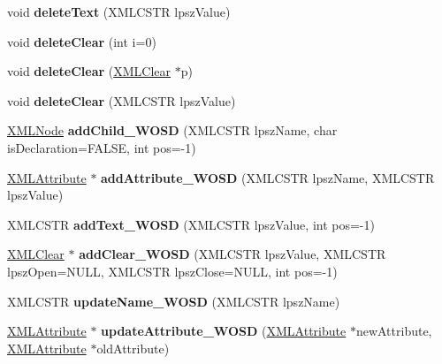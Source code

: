 \begin{DoxyCompactItemize}
void {\bfseries delete\+Text} (X\+M\+L\+C\+S\+TR lpsz\+Value)
\item 
\hypertarget{struct_x_m_l_node_a44b72c82310eb4319dba46eb9cc9f6e9}{}\label{struct_x_m_l_node_a44b72c82310eb4319dba46eb9cc9f6e9} 
void {\bfseries delete\+Clear} (int i=0)
\item 
\hypertarget{struct_x_m_l_node_ae92182823d3d5b40893103ad222ec4a8}{}\label{struct_x_m_l_node_ae92182823d3d5b40893103ad222ec4a8} 
void {\bfseries delete\+Clear} (\hyperlink{struct_x_m_l_clear}{X\+M\+L\+Clear} $\ast$p)
\item 
\hypertarget{struct_x_m_l_node_a8fff4baa9a8000f8662ee302438fff64}{}\label{struct_x_m_l_node_a8fff4baa9a8000f8662ee302438fff64} 
void {\bfseries delete\+Clear} (X\+M\+L\+C\+S\+TR lpsz\+Value)
\item 
\hypertarget{struct_x_m_l_node_acb8f9583792c008c80a6c788f3dedf39}{}\label{struct_x_m_l_node_acb8f9583792c008c80a6c788f3dedf39} 
\hyperlink{struct_x_m_l_node}{X\+M\+L\+Node} {\bfseries add\+Child\+\_\+\+W\+O\+SD} (X\+M\+L\+C\+S\+TR lpsz\+Name, char is\+Declaration=F\+A\+L\+SE, int pos=-\/1)
\item 
\hypertarget{struct_x_m_l_node_a776e46bdd596a7eff1d2dd4105c64034}{}\label{struct_x_m_l_node_a776e46bdd596a7eff1d2dd4105c64034} 
\hyperlink{struct_x_m_l_attribute}{X\+M\+L\+Attribute} $\ast$ {\bfseries add\+Attribute\+\_\+\+W\+O\+SD} (X\+M\+L\+C\+S\+TR lpsz\+Name, X\+M\+L\+C\+S\+TR lpsz\+Value)
\item 
\hypertarget{struct_x_m_l_node_ab05f39710a61064adf3af30fd430acf2}{}\label{struct_x_m_l_node_ab05f39710a61064adf3af30fd430acf2} 
X\+M\+L\+C\+S\+TR {\bfseries add\+Text\+\_\+\+W\+O\+SD} (X\+M\+L\+C\+S\+TR lpsz\+Value, int pos=-\/1)
\item 
\hypertarget{struct_x_m_l_node_a6ea1fad6ada2038f5cf2605839694d31}{}\label{struct_x_m_l_node_a6ea1fad6ada2038f5cf2605839694d31} 
\hyperlink{struct_x_m_l_clear}{X\+M\+L\+Clear} $\ast$ {\bfseries add\+Clear\+\_\+\+W\+O\+SD} (X\+M\+L\+C\+S\+TR lpsz\+Value, X\+M\+L\+C\+S\+TR lpsz\+Open=N\+U\+LL, X\+M\+L\+C\+S\+TR lpsz\+Close=N\+U\+LL, int pos=-\/1)
\item 
\hypertarget{struct_x_m_l_node_af7cff0d6f43d4e6f163f2738a71ec4e5}{}\label{struct_x_m_l_node_af7cff0d6f43d4e6f163f2738a71ec4e5} 
X\+M\+L\+C\+S\+TR {\bfseries update\+Name\+\_\+\+W\+O\+SD} (X\+M\+L\+C\+S\+TR lpsz\+Name)
\item 
\hypertarget{struct_x_m_l_node_a62a2c0cad7809a03afc485351c9560da}{}\label{struct_x_m_l_node_a62a2c0cad7809a03afc485351c9560da} 
\hyperlink{struct_x_m_l_attribute}{X\+M\+L\+Attribute} $\ast$ {\bfseries update\+Attribute\+\_\+\+W\+O\+SD} (\hyperlink{struct_x_m_l_attribute}{X\+M\+L\+Attribute} $\ast$new\+Attribute, \hyperlink{struct_x_m_l_attribute}{X\+M\+L\+Attribute} $\ast$old\+Attribute)

\end{DoxyCompactItemize}
